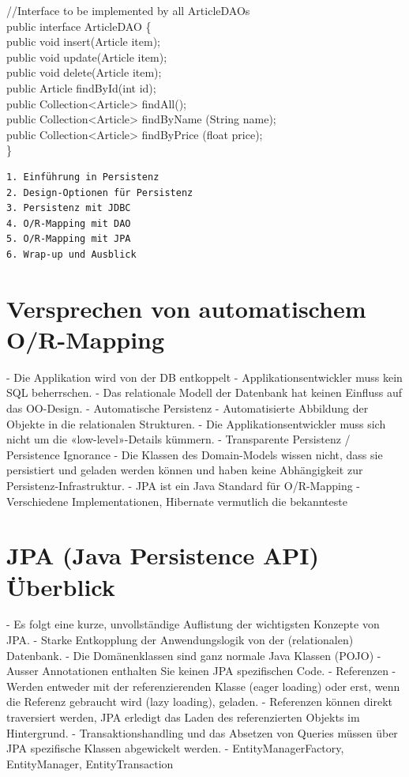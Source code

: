 //Interface to be implemented by all ArticleDAOs\\
public interface ArticleDAO \{\\
public void insert(Article item);\\
public void update(Article item);\\
public void delete(Article item);\\
public Article findById(int id);\\
public Collection<Article> findAll();\\
public Collection<Article> findByName (String name);\\
public Collection<Article> findByPrice (float price);\\
\}

\begin{verbatim}
1. Einführung in Persistenz
2. Design-Optionen für Persistenz
3. Persistenz mit JDBC
4. O/R-Mapping mit DAO
5. O/R-Mapping mit JPA
6. Wrap-up und Ausblick
\end{verbatim}

\section*{Versprechen von automatischem O/R-Mapping}
- Die Applikation wird von der DB entkoppelt
- Applikationsentwickler muss kein SQL beherrschen.
- Das relationale Modell der Datenbank hat keinen Einfluss auf das OO-Design.
- Automatische Persistenz
- Automatisierte Abbildung der Objekte in die relationalen Strukturen.
- Die Applikationsentwickler muss sich nicht um die «low-level»-Details kümmern.
- Transparente Persistenz / Persistence Ignorance
- Die Klassen des Domain-Models wissen nicht, dass sie persistiert und geladen werden können und haben keine Abhängigkeit zur Persistenz-Infrastruktur.
- JPA ist ein Java Standard für O/R-Mapping
- Verschiedene Implementationen, Hibernate vermutlich die bekannteste

\section*{JPA (Java Persistence API) Überblick}
- Es folgt eine kurze, unvollständige Auflistung der wichtigsten Konzepte von JPA.
- Starke Entkopplung der Anwendungslogik von der (relationalen) Datenbank.
- Die Domänenklassen sind ganz normale Java Klassen (POJO)
- Ausser Annotationen enthalten Sie keinen JPA spezifischen Code.
- Referenzen
- Werden entweder mit der referenzierenden Klasse (eager loading) oder erst, wenn die Referenz gebraucht wird (lazy loading), geladen.
- Referenzen können direkt traversiert werden, JPA erledigt das Laden des referenzierten Objekts im Hintergrund.
- Transaktionshandling und das Absetzen von Queries müssen über JPA spezifische Klassen abgewickelt werden.
- EntityManagerFactory, EntityManager, EntityTransaction

